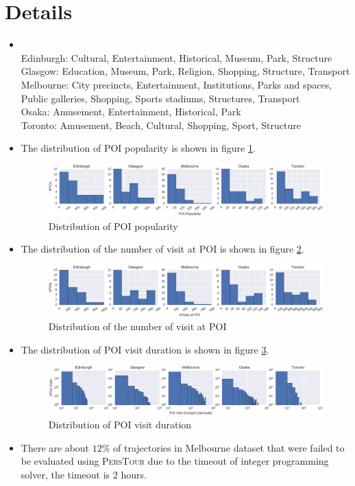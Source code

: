 \appendix
\section{Details}
\begin{itemize}
\item {} \\
      Edinburgh: Cultural, Entertainment, Historical, Museum, Park, Structure \\
      Glasgow: Education, Museum, Park, Religion, Shopping, Structure, Transport \\
      Melbourne: City precincts, Entertainment, Institutions, Parks and spaces, Public galleries, Shopping, 
                 Sports stadiums, Structures, Transport \\
      Osaka: Amusement, Entertainment, Historical, Park \\
      Toronto: Amusement, Beach, Cultural, Shopping, Sport, Structure 
\item The distribution of POI popularity is shown in figure \ref{fig:popularity}.
      \begin{figure}
      \includegraphics[width=\textwidth]{fig/poi_popularity.pdf}
      \caption{Distribution of POI popularity}
      \label{fig:popularity}
      \end{figure}
\item The distribution of the number of visit at POI is shown in figure \ref{fig:nvisit}.
      \begin{figure}
      \includegraphics[width=\textwidth]{fig/poi_nvisit.pdf}
      \caption{Distribution of the number of visit at POI}
      \label{fig:nvisit}
      \end{figure}
\item The distribution of POI visit duration is shown in figure \ref{fig:duration}.
      \begin{figure}
      \includegraphics[width=\textwidth]{fig/visit_duration.pdf}
      \caption{Distribution of POI visit duration}
      \label{fig:duration}
      \end{figure}
\item There are about $12$\% of trajectories in Melbourne dataset that were failed to be evaluated 
      using \textsc{PersTour} due to the timeout of integer programming solver, the timeout is $2$ hours.
\end{itemize}
